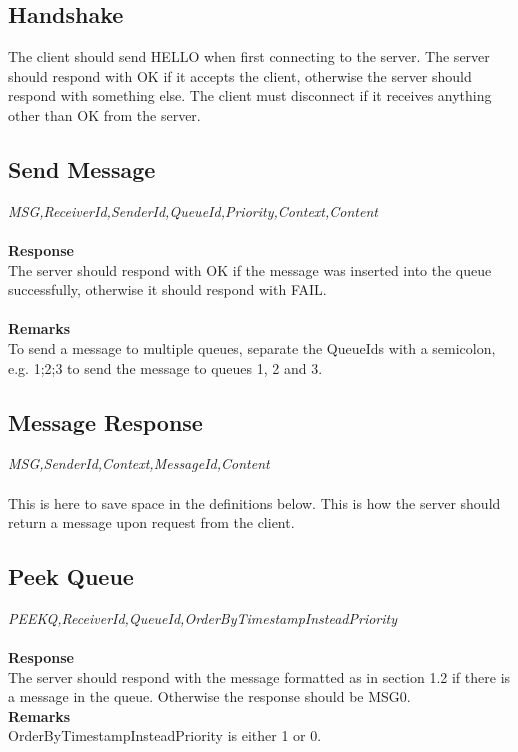 \documentclass{article}
\begin{document}
            \subsection{Handshake}
                The client should send HELLO when first connecting to the server. The server should respond with OK if it accepts the client, otherwise the server should respond with something else. The client must disconnect if it receives anything other than OK from the server.


            \subsection{Send Message}
                \indent\indent\textit{MSG,ReceiverId,SenderId,QueueId,Priority,Context,Content}\\
                \\
                \textbf{Response}\\
                The server should respond with OK if the message was inserted into the queue successfully, otherwise it should respond with FAIL.\\
                \\
                \textbf{Remarks}\\
                To send a message to multiple queues, separate the QueueIds with a semicolon, e.g. 1;2;3 to send the message to queues 1, 2 and 3.

            \subsection{Message Response}
                \indent\indent\textit{MSG,SenderId,Context,MessageId,Content}\\
                \\
                This is here to save space in the definitions below. This is how the server should return a message upon request from the client.

            \subsection{Peek Queue}
                \indent\indent \textit{PEEKQ,ReceiverId,QueueId,OrderByTimestampInsteadPriority}\\
                \\
                \textbf{Response}\\
                The server should respond with the message formatted as in section 1.2 if there is a message in the queue. Otherwise the response should be MSG0.\\
                \textbf{Remarks}\\
                OrderByTimestampInsteadPriority is either 1 or 0.
\end{document}
